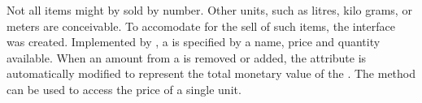 %  

Not all items might by sold by number.
Other units, such as litres, kilo grams, or meters are conceivable.
To accomodate for the sell of such items, the  interface was created.
Implemented by , a  is specified by a name, price and quantity available.
When an amount from a  is removed or added, the  attribute is automatically modified to represent the total monetary value of the .
The  method can be used to access the price of a single unit.

